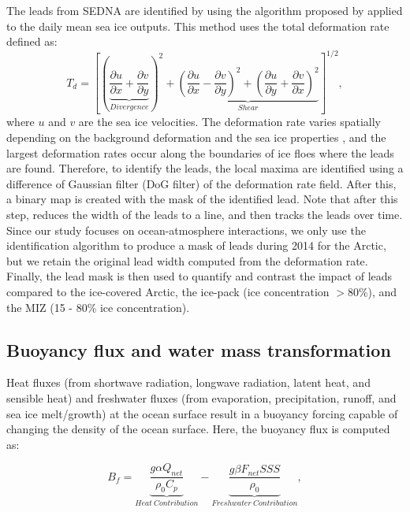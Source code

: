 \documentclass[draft]{agujournal2019}
\begin{document}
The leads from SEDNA are identified by using the algorithm proposed by  applied to the daily mean sea ice outputs. This method uses the total deformation rate defined as: 
\begin{equation}
    T_d = \left[\left(\underbrace{\frac{\partial u}{\partial x} +\frac{\partial v}{\partial y}}_{Divergence}\right)^2 + \underbrace{\left(\frac{\partial u}{\partial x} - \frac{\partial v}{\partial y}\right)^2+ \left(\frac{\partial u}{\partial y} + \frac{\partial v}{\partial x}\right)^2}_{Shear}\right]^{1/2},
    \label{eq:eq1}
\end{equation}
where $u$ and $v$ are the sea ice velocities. The deformation rate varies spatially depending on the background deformation and the sea ice properties \cite{Reiser_LKF_2020}, and the largest deformation rates occur along the boundaries of ice floes where the leads are found. Therefore, to identify the leads, the local maxima are identified using a difference of Gaussian filter (DoG filter) of the deformation rate field. After this, a binary map is created with the mask of the identified lead. Note that after this step,  reduces the width of the leads to a line, and then tracks the leads over time. Since our study focuses on ocean-atmosphere interactions, we only use the identification algorithm to produce a mask of leads during 2014 for the Arctic, but we retain the original lead width computed from the deformation rate. Finally, the lead mask is then used to quantify and contrast the impact of leads compared to the ice-covered Arctic, the ice-pack (ice concentration $> 80\%$), and the MIZ (15 - 80\% ice concentration).

\subsection{Buoyancy flux and water mass transformation}

Heat fluxes (from shortwave radiation, longwave radiation, latent heat, and sensible heat) and freshwater fluxes (from evaporation, precipitation, runoff, and sea ice melt/growth) at the ocean surface result in a buoyancy forcing capable of changing the density of the ocean surface. Here, the buoyancy flux is computed as:

\begin{equation}
    B_f = \underbrace{\frac{g \alpha Q_{net}}{\rho_0 C_p}}_{Heat\ Contribution} - \underbrace{\frac{g \beta F_{net} SSS }{\rho_0}}_{Freshwater\ Contribution},
    \label{eq:eq2}
\end{equation}
\end{document}
